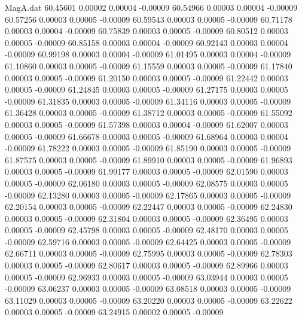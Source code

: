 \begin{filecontents}{MagA.dat}
  60.45601    0.00002    0.00004   -0.00009
  60.54966    0.00003    0.00004   -0.00009
  60.57256    0.00003    0.00005   -0.00009
  60.59543    0.00003    0.00005   -0.00009
  60.71178    0.00003    0.00004   -0.00009
  60.75839    0.00003    0.00005   -0.00009
  60.80512    0.00003    0.00005   -0.00009
  60.85158    0.00003    0.00004   -0.00009
  60.92143    0.00003    0.00004   -0.00009
  60.99198    0.00003    0.00004   -0.00009
  61.01495    0.00003    0.00004   -0.00009
  61.10860    0.00003    0.00005   -0.00009
  61.15559    0.00003    0.00005   -0.00009
  61.17840    0.00003    0.00005   -0.00009
  61.20150    0.00003    0.00005   -0.00009
  61.22442    0.00003    0.00005   -0.00009
  61.24845    0.00003    0.00005   -0.00009
  61.27175    0.00003    0.00005   -0.00009
  61.31835    0.00003    0.00005   -0.00009
  61.34116    0.00003    0.00005   -0.00009
  61.36428    0.00003    0.00005   -0.00009
  61.38712    0.00003    0.00005   -0.00009
  61.55092    0.00003    0.00005   -0.00009
  61.57398    0.00003    0.00004   -0.00009
  61.62007    0.00003    0.00005   -0.00009
  61.66678    0.00003    0.00005   -0.00009
  61.68964    0.00003    0.00004   -0.00009
  61.78222    0.00003    0.00005   -0.00009
  61.85190    0.00003    0.00005   -0.00009
  61.87575    0.00003    0.00005   -0.00009
  61.89910    0.00003    0.00005   -0.00009
  61.96893    0.00003    0.00005   -0.00009
  61.99177    0.00003    0.00005   -0.00009
  62.01590    0.00003    0.00005   -0.00009
  62.06180    0.00003    0.00005   -0.00009
  62.08575    0.00003    0.00005   -0.00009
  62.13280    0.00003    0.00005   -0.00009
  62.17865    0.00003    0.00005   -0.00009
  62.20154    0.00003    0.00005   -0.00009
  62.22447    0.00003    0.00005   -0.00009
  62.24830    0.00003    0.00005   -0.00009
  62.31804    0.00003    0.00005   -0.00009
  62.36495    0.00003    0.00005   -0.00009
  62.45798    0.00003    0.00005   -0.00009
  62.48170    0.00003    0.00005   -0.00009
  62.59716    0.00003    0.00005   -0.00009
  62.64425    0.00003    0.00005   -0.00009
  62.66711    0.00003    0.00005   -0.00009
  62.75995    0.00003    0.00005   -0.00009
  62.78303    0.00003    0.00005   -0.00009
  62.80617    0.00003    0.00005   -0.00009
  62.89966    0.00003    0.00005   -0.00009
  62.96933    0.00003    0.00005   -0.00009
  63.03944    0.00003    0.00005   -0.00009
  63.06237    0.00003    0.00005   -0.00009
  63.08518    0.00003    0.00005   -0.00009
  63.11029    0.00003    0.00005   -0.00009
  63.20220    0.00003    0.00005   -0.00009
  63.22622    0.00003    0.00005   -0.00009
  63.24915    0.00002    0.00005   -0.00009

\end{filecontents}

